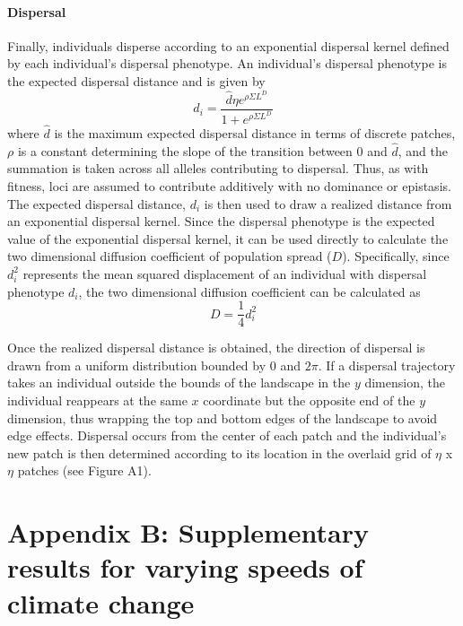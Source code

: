 \documentclass[11pt]{article}
\begin{document}
\paragraph{Dispersal}
Finally, individuals disperse according to an exponential dispersal kernel defined by each individual's dispersal phenotype. An individual's dispersal phenotype is the expected dispersal distance and is given by
\begin{equation}
d_{i} = \frac{\hat{d}\eta e^{\rho\Sigma L^{D}}}{1+e^{\rho\Sigma L^{D}}} 
\end{equation}
where $\hat{d}$ is the maximum expected dispersal distance in terms of discrete patches, $\rho$ is a constant determining the slope of the transition between $0$ and $\hat{d}$, and the summation is taken across all alleles contributing to dispersal. Thus, as with fitness, loci are assumed to contribute additively with no dominance or epistasis. The expected dispersal distance, $d_{i}$ is then used to draw a realized distance from an exponential dispersal kernel. Since the dispersal phenotype is the expected value of the exponential dispersal kernel, it can be used directly to calculate the two dimensional diffusion coefficient of population spread ($D$). Specifically, since $d_{i}^{2}$ represents the mean squared displacement of an individual with dispersal phenotype $d_{i}$, the two dimensional diffusion coefficient can be calculated as
\begin{equation}
D = \frac{1}{4}d_{i}^{2}
\end{equation}

Once the realized dispersal distance is obtained, the direction of dispersal is drawn from a uniform distribution bounded by $0$ and $2\pi$. If a dispersal trajectory takes an individual outside the bounds of the landscape in the $y$ dimension, the individual reappears at the same $x$ coordinate but the opposite end of the $y$ dimension, thus wrapping the top and bottom edges of the landscape to avoid edge effects. Dispersal occurs from the center of each patch and the individual's new patch is then determined according to its location in the overlaid grid of $\eta$ x $\eta$ patches (see Figure A1).

\newpage{}

\section*{Appendix B: Supplementary results for varying speeds of climate change}

\renewcommand{\theequation}{B\arabic{equation}}
\renewcommand{\thetable}{B\arabic{table}}
\setcounter{equation}{0}  %
\setcounter{figure}{0}
\setcounter{table}{0}
\end{document}
